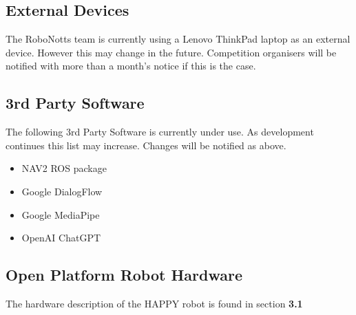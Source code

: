 \subsection{External Devices}

The RoboNotts team is currently using a Lenovo ThinkPad laptop as an external device. However this may change in the future. Competition organisers will be notified with more than a month's notice if this is the case.

\subsection{3rd Party Software}
The following 3rd Party Software is currently under use. As development continues this list may increase. Changes will be notified as above.

\begin{itemize}
    \item NAV2 ROS package
    \item Google DialogFlow
    \item Google MediaPipe
    \item OpenAI ChatGPT
\end{itemize}

\subsection{Open Platform Robot Hardware}

The hardware description of the HAPPY robot is found in section \textbf{3.1}